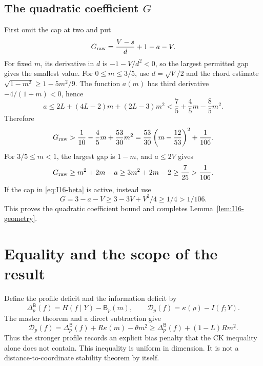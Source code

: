 \documentclass[11pt]{article}
\theoremstyle{remark}\newtheorem{remark}[theorem]{Remark}
\newcommand{\Bprof}{\mathsf B_p}\newcommand{\Pprof}{\Phi_p}
\numberwithin{equation}{section}
\begin{document}
\subsection{The quadratic coefficient \texorpdfstring{$G$}{G}}
First omit the cap at two and put
\[
 G_{\rm raw}=\frac{V-s}{d}+1-a-V.
\]
For fixed $m$, its derivative in $d$ is $-1-V/d^2<0$, so the largest
permitted gap gives the smallest value. For $0\le m\le3/5$, use
$d=\sqrt V/2$ and the chord estimate $\sqrt{1-m^2}\ge1-5m^2/9$.
The function $a(m)$ has third derivative $-4/(1+m)<0$, hence
\[
 a\le2L+(4L-2)m+(2L-3)m^2
 <\frac75+\frac45m-\frac85m^2.
\]
Therefore
\[
 G_{\rm raw}>\frac1{10}-\frac45m+\frac{53}{30}m^2
 =\frac{53}{30}\left(m-\frac{12}{53}\right)^2+\frac1{106}.
\]
For $3/5\le m<1$, the largest gap is $1-m$, and $a\le2V$ gives
\[
 G_{\rm raw}\ge m^2+2m-a\ge3m^2+2m-2\ge\frac7{25}>\frac1{106}.
\]
If the cap in \eqref{eq:I16-beta} is active, instead use
\[
 G=3-a-V\ge3-3V+V^2/4\ge1/4>1/106.
\]
This proves the quadratic coefficient bound and completes
Lemma~\ref{lem:I16-geometry}.
\section{Equality and the scope of the result}\label{sec:equality}
Define the profile deficit and the information deficit by
\[
\Delta^{\mathsf B}_p(f)=H(f\mid Y)-\Bprof(m),\qquad
\mathcal D_p(f)=\kappa(\rho)-I(f;Y).
\]
The master theorem and a direct subtraction give
\begin{equation}\label{eq:gap-decomposition}
\mathcal D_p(f)=\Delta^{\mathsf B}_p(f)+R\kappa(m)-\theta m^2
\ge\Delta^{\mathsf B}_p(f)+(1-L)Rm^2.
\end{equation}
Thus the stronger profile records an explicit bias penalty that the CK inequality alone does not contain. This inequality is uniform in dimension. It is not a distance-to-coordinate stability theorem by itself.
\end{document}

